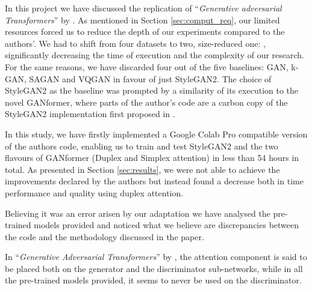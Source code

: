 \documentclass{article}
\begin{document}
In this project we have discussed the replication of ``\emph{Generative adversarial Transformers}'' 
by \citet{hudson2021generative}.
As mentioned in Section \ref{sec:comput_req}, our limited resources forced us to reduce the depth 
of our experiments compared to the authors'.
We had to shift from four datasets to two, size-reduced one: \citet{cartoonset}, significantly 
decreasing the time of execution and the complexity of our research.
For the same reasons, we have discarded four out of the five baselines: GAN, k-GAN, SAGAN and 
VQGAN in favour of just StyleGAN2.
The choice of StyleGAN2 as the baseline was prompted by a similarity of its execution to the novel 
GANformer, where parts of the author's code are a carbon copy of the StyleGAN2 implementation 
first proposed in \citet{karras2019style}.

In this study, we have firstly implemented a Google Colab Pro compatible version of the authors code, enabling us to train and test StyleGAN2 and the two flavours of GANformer (Duplex and Simplex attention) in less than 54 hours in total.
As presented in Section \ref{sec:results}, we were not able to achieve the improvements declared by 
the authors but instead found a decrease both in time performance and quality using duplex attention.

Believing it was an error arisen by our adaptation we have analysed the pre-trained models provided 
and noticed what we believe are discrepancies between the code and the methodology discussed in the paper.

In ``\emph{Generative Adversarial Transformers}'' by \citet{hudson2021generative}, the attention 
component is said to be placed both on the generator and the discriminator sub-networks, while in all the pre-trained models provided, it seems to never be used on the discriminator.

\end{document}

